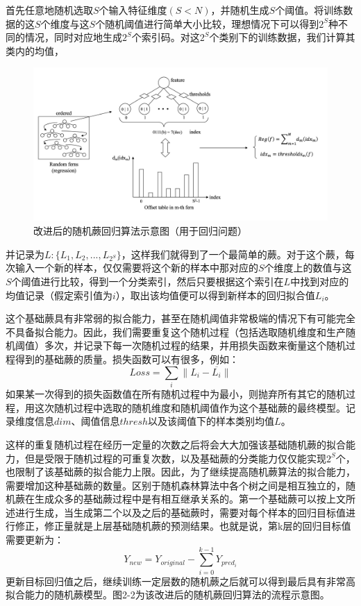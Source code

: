 首先任意地随机选取$S$个输入特征维度$(S<N)$，并随机生成$S$个阈值。将训练数据的这$S$个维度与这$S$个随机阈值进行简单大小比较，理想情况下可以得到$2^S$种不同的情况，同时对应地生成$2^S$个索引码。对这$2^S$个类别下的训练数据，我们计算其类内的均值，
\begin{figure}[htb]
	\centering 
	\includegraphics[width=\textwidth]{./mypic/改进后的随机蕨算法示意图.jpg} 
	\caption{改进后的随机蕨回归算法示意图（用于回归问题）} 
\end{figure}
并记录为$L:\{L_1,L_2,...,L_{2^S}\}$，这样我们就得到了一个最简单的蕨。对于这个蕨，每次输入一个新的样本，仅仅需要将这个新的样本中那对应的$S$个维度上的数值与这$S$个阈值进行比较，得到一个分类索引，然后只要根据这个索引在$L$中找到对应的均值记录（假定索引值为$i$），取出该均值便可以得到新样本的回归拟合值$L_i$。

这个基础蕨具有非常弱的拟合能力，甚至在随机阈值非常极端的情况下有可能完全不具备拟合能力。因此，我们需要重复这个随机过程（包括选取随机维度和生产随机阈值）多次，并记录下每一次随机过程的结果，并用损失函数来衡量这个随机过程得到的基础蕨的质量。损失函数可以有很多，例如：
\begin{equation}
	Loss=\sum_i{\|L_i-\overline{L_i}\|}
\end{equation}
如果某一次得到的损失函数值在所有随机过程中为最小，则抛弃所有其它的随机过程，用这次随机过程中选取的随机维度和随机阈值作为这个基础蕨的最终模型。记录维度信息$dim$、阈值信息$thresh$以及该阈值下的样本类别均值$L$。

这样的重复随机过程在经历一定量的次数之后将会大大加强该基础随机蕨的拟合能力，但是受限于随机过程的可重复次数，以及基础蕨的分类能力仅仅能实现$2^S$个，也限制了该基础蕨的拟合能力上限。因此，为了继续提高随机蕨算法的拟合能力，需要增加这种基础蕨的数量。区别于随机森林算法中各个树之间是相互独立的，随机蕨在生成众多的基础蕨过程中是有相互继承关系的。第一个基础蕨可以按上文所述进行生成，当生成第二个以及之后的基础蕨时，需要对每个样本的回归目标值进行修正，修正量就是上层基础随机蕨的预测结果。也就是说，第k层的回归目标值需要更新为：
\begin{equation}
	Y_{new}=Y_{original}-\sum_{i=0}^{k-1} Y_{pred_i}
\end{equation}
更新目标回归值之后，继续训练一定层数的随机蕨之后就可以得到最后具有非常高拟合能力的随机蕨模型。图2-2为该改进后的随机蕨回归算法的流程示意图。

